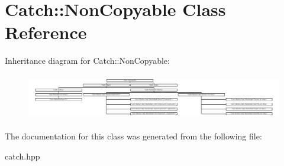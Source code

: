 \hypertarget{classCatch_1_1NonCopyable}{}\section{Catch\+:\+:Non\+Copyable Class Reference}
\label{classCatch_1_1NonCopyable}
Inheritance diagram for Catch\+:\+:Non\+Copyable\+:\begin{figure}[H]
\begin{center}
\leavevmode
\includegraphics[height=2.004474cm]{classCatch_1_1NonCopyable}
\end{center}
\end{figure}


The documentation for this class was generated from the following file\+:\begin{DoxyCompactItemize}
\item 
catch.\+hpp\end{DoxyCompactItemize}
